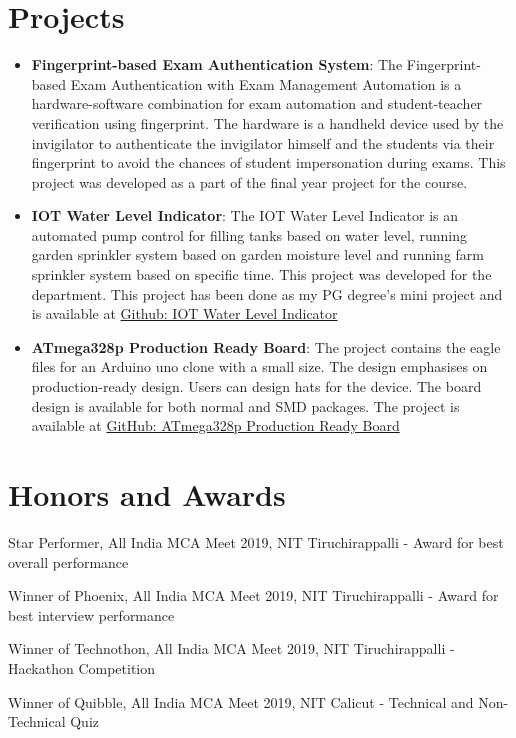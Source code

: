 \documentclass[a4paper,20pt]{article}
\newcommand{\resumeItem}[2]{
	\item\small{
		\textbf{#1}{: #2 \vspace{-2pt}}
	}
}
\newcommand{\resumeSubItem}[2]{\resumeItem{#1}{#2}\vspace{-3pt}}
\newcommand{\resumeSubHeadingListStart}{\begin{itemize}[leftmargin=*]}
\newcommand{\resumeSubHeadingListEnd}{\end{itemize}}
\begin{document}
\section{Projects}
	\resumeSubHeadingListStart
		\resumeSubItem{Fingerprint-based Exam Authentication System}{The Fingerprint-based Exam Authentication with Exam Management Automation is a hardware-software combination for exam automation and student-teacher verification using fingerprint. The hardware is a handheld device used by the invigilator to authenticate the invigilator himself and the students via their fingerprint to avoid the chances of student impersonation during exams. This project was developed as a part of the final year project for the course.}
		
		\vspace{2pt}
		\resumeSubItem{IOT Water Level Indicator}{The IOT Water Level Indicator is an automated pump control for filling tanks based on water level, running garden sprinkler system based on garden moisture level and running farm sprinkler system based on specific time. This project was developed for the department. This project has been done as my PG degree’s mini project and is available at \href{https://github.com/sashwat-project-hardware/iot-water-level-indicator}{Github: IOT Water Level Indicator}}
		
		\vspace{2pt}
		\resumeSubItem{ATmega328p Production Ready Board}{The project contains the eagle files for an Arduino uno clone with a small size. The design emphasises on production-ready design. Users can design hats for the device. The board design is available for both normal and SMD packages. The project is available at \href{https://github.com/sashwat-project-hardware/sph-mc-one}{GitHub: ATmega328p Production Ready Board}}
		
	\resumeSubHeadingListEnd

\vspace{-5pt}
\section{Honors and Awards}
	\begin{description}[font=$\bullet$]
		\item {Star Performer, All India MCA Meet 2019, NIT Tiruchirappalli - Award for best overall performance}
		\vspace{-5pt}
		\item {Winner of Phoenix, All India MCA Meet 2019, NIT Tiruchirappalli - Award for best interview performance}
		\vspace{-5pt}
		\item {Winner of Technothon, All India MCA Meet 2019, NIT Tiruchirappalli - Hackathon Competition}
		\vspace{-5pt}
		\item {Winner of Quibble, All India MCA Meet 2019, NIT Calicut - Technical and Non-Technical Quiz}
	\end{description}
\end{document}
